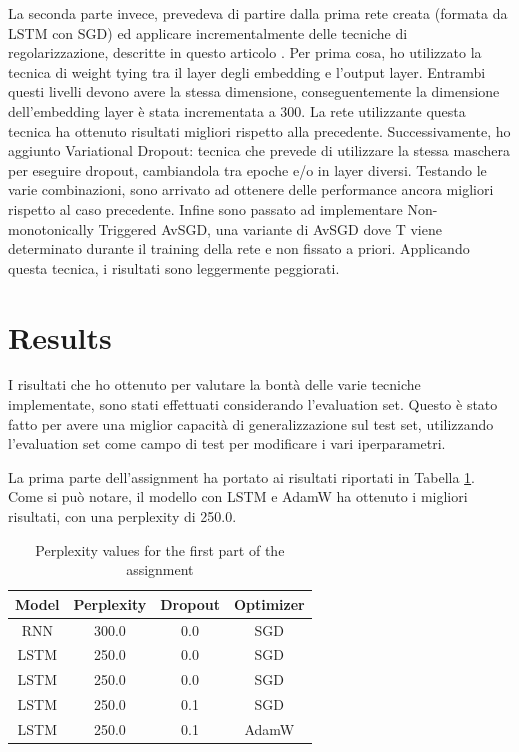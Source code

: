 \documentclass[a4paper]{article}
\begin{document}
La seconda parte invece, prevedeva di partire dalla prima rete creata (formata da LSTM con SGD) ed applicare incrementalmente delle tecniche di regolarizzazione, descritte in questo articolo \cite{merity2017regularizing}. 
Per prima cosa, ho utilizzato la tecnica di weight tying tra il layer degli embedding e l’output layer. Entrambi questi livelli devono avere la stessa dimensione, conseguentemente la dimensione dell’embedding layer è stata incrementata a 300. La rete utilizzante questa tecnica ha ottenuto risultati migliori rispetto alla precedente.
Successivamente, ho aggiunto Variational Dropout: tecnica che prevede di utilizzare la stessa maschera per eseguire dropout, cambiandola tra epoche e/o in layer diversi. Testando le varie combinazioni, sono arrivato ad ottenere delle performance ancora migliori rispetto al caso precedente.
Infine sono passato ad implementare Non-monotonically Triggered AvSGD, una variante di AvSGD dove T viene determinato durante il training della rete e non fissato a priori.
Applicando questa tecnica, i risultati sono leggermente peggiorati.


\section{Results}
I risultati che ho ottenuto per valutare la bontà delle varie tecniche implementate, sono stati effettuati considerando l’evaluation set. Questo è stato fatto per avere una miglior capacità di generalizzazione sul test set, utilizzando l’evaluation set come campo di test per modificare i vari iperparametri. 

\vspace{0.5cm}

La prima parte dell'assignment ha portato ai risultati riportati in Tabella \ref{tab:results1}. Come si può notare, il modello con LSTM e AdamW ha ottenuto i migliori risultati, con una perplexity di 250.0.
\begin{table}[h]
  \centering
  \begin{tabular}{|c|c|c|c|}
    \hline
    \textbf{Model} & \textbf{Perplexity} & \textbf{Dropout} & \textbf{Optimizer} \\
    \hline
    RNN &  300.0 & 0.0 & SGD \\
    LSTM &  250.0 & 0.0 & SGD \\
    LSTM &  250.0 & 0.0 & SGD \\
    LSTM &  250.0 & 0.1 & SGD \\
    LSTM &  250.0 & 0.1 & AdamW \\
    \hline
  \end{tabular}
  \caption{Perplexity values for the first part of the assignment}
  \label{tab:results1}

\end{table}
\end{document}
